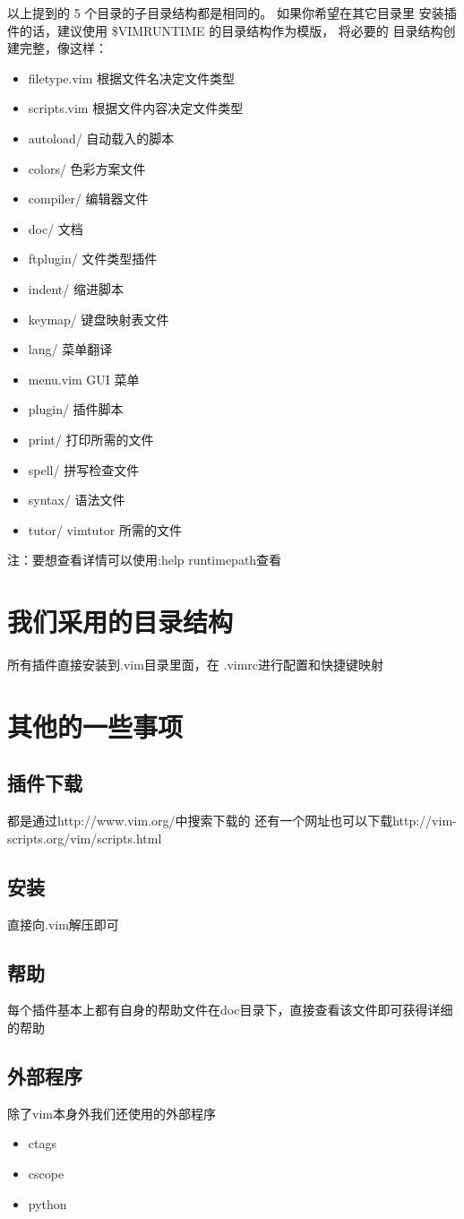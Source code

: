 以上提到的 5 个目录的子目录结构都是相同的。 如果你希望在其它目录里
安装插件的话，建议使用 \$VIMRUNTIME 的目录结构作为模版， 将必要的
目录结构创建完整，像这样： 
\begin{itemize}
	\item filetype.vim	根据文件名决定文件类型
	\item scripts.vim	根据文件内容决定文件类型
	\item autoload/	自动载入的脚本
	\item colors/	色彩方案文件
	\item compiler/	编辑器文件
	\item doc/		文档
	\item ftplugin/	文件类型插件
	\item indent/	缩进脚本
	\item keymap/	键盘映射表文件
	\item lang/		菜单翻译
	\item menu.vim	GUI 菜单
	\item plugin/	插件脚本 
	\item print/	打印所需的文件 
	\item spell/	拼写检查文件 
	\item syntax/	语法文件 
	\item tutor/	vimtutor 所需的文件 
\end{itemize}
注：要想查看详情可以使用:help runtimepath查看

\section{我们采用的目录结构}
所有插件直接安装到.vim目录里面，在 .vimrc进行配置和快捷键映射
\section{其他的一些事项}
\subsection{插件下载}
都是通过http://www.vim.org/中搜索下载的
还有一个网址也可以下载http://vim-scripts.org/vim/scripts.html
\subsection{安装}
直接向.vim解压即可
\subsection{帮助}
每个插件基本上都有自身的帮助文件在doc目录下，直接查看该文件即可获得详细的帮助
\subsection{外部程序}
除了vim本身外我们还使用的外部程序
\begin{itemize}
    \item ctags
    \item cscope
    \item python
\end{itemize}

\newpage
